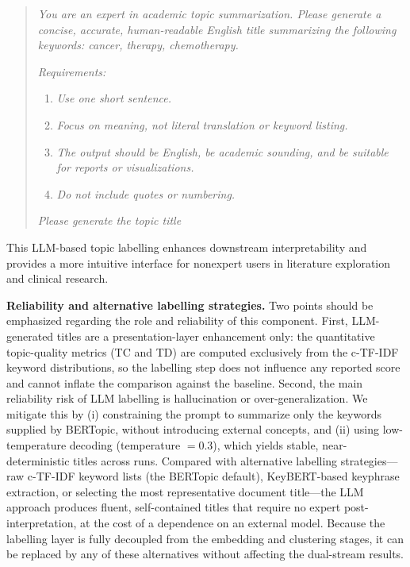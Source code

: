 \documentclass[authorproof,JACIII,researchpaper]{fujipressarticle}
\begin{document}
\begin{quote}
\textit{You are an expert in academic topic summarization. Please generate a concise, accurate, human-readable English title summarizing the following keywords: cancer, therapy, chemotherapy.}

\textit{Requirements:}
\begin{enumerate}
    \item \textit{Use one short sentence.}
    \item \textit{Focus on meaning, not literal translation or keyword listing.}
    \item \textit{The output should be English, be academic sounding, and be suitable for reports or visualizations.}
    \item \textit{Do not include quotes or numbering.}
\end{enumerate}

\textit{Please generate the topic title}
\end{quote}

This LLM-based topic labelling enhances downstream interpretability and provides a more intuitive interface for nonexpert users in literature exploration and clinical research.

{\color{red}%
\noindent\textbf{Reliability and alternative labelling strategies.}
Two points should be emphasized regarding the role and reliability of this component. First, LLM-generated titles are a presentation-layer enhancement only: the quantitative topic-quality metrics (TC and TD) are computed exclusively from the c-TF-IDF keyword distributions, so the labelling step does not influence any reported score and cannot inflate the comparison against the baseline. Second, the main reliability risk of LLM labelling is hallucination or over-generalization. We mitigate this by (i) constraining the prompt to summarize only the keywords supplied by BERTopic, without introducing external concepts, and (ii) using low-temperature decoding (temperature $=0.3$), which yields stable, near-deterministic titles across runs. Compared with alternative labelling strategies---raw c-TF-IDF keyword lists (the BERTopic default), KeyBERT-based keyphrase extraction, or selecting the most representative document title---the LLM approach produces fluent, self-contained titles that require no expert post-interpretation, at the cost of a dependence on an external model. Because the labelling layer is fully decoupled from the embedding and clustering stages, it can be replaced by any of these alternatives without affecting the dual-stream results.
}%
\end{document}
